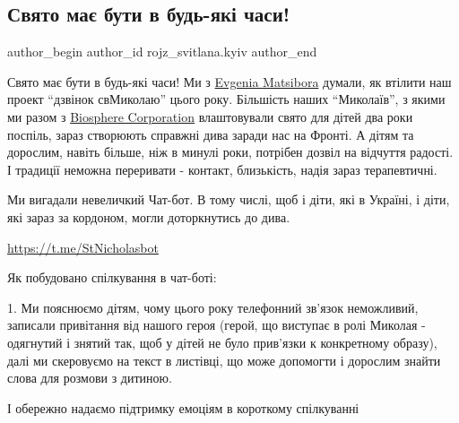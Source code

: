  
 
 
 
 
 
\subsection{Свято має бути в будь-які часи!}
\label{sec:14_12_2022.fb.rojz_svitlana.kyiv.1.svjato_chasy}
 
\ifcmt
 author_begin
   author_id rojz_svitlana.kyiv
 author_end
\fi

Свято має бути в будь-які часи! Ми з
\href{https://www.facebook.com/jenia.bogachyk}{Evgenia Matsibora}  думали, як
втілити наш проект \enquote{дзвінок свМиколаю} цього року. Більшість наших  \enquote{Миколаїв},
з якими ми разом з
\href{https://www.facebook.com/biosphere.corporation}{Biosphere Corporation}
влаштовували свято для дітей два роки поспіль, зараз  створюють справжні дива
заради нас на Фронті. А дітям та дорослим, навіть більше, ніж в минулі роки,
потрібен дозвіл на відчуття радості. І традиції неможна переривати - контакт,
близькість, надія зараз терапевтичні. 


Ми вигадали невеличкий Чат-бот. В тому числі, щоб і діти, які в Україні, і
діти, які зараз за кордоном, могли доторкнутись до дива.

\url{https://t.me/StNicholasbot}

Як побудовано спілкування в чат-боті:

1. Ми пояснюємо  дітям, чому цього року телефонний зв'язок неможливий, записали
привітання від нашого героя (герой, що виступає в ролі Миколая - одягнутий і
знятий так, щоб у дітей не було прив'язки к конкретному образу), далі ми
скеровуємо на текст в листівці, що може допомогти і дорослим знайти слова для
розмови з дитиною.

І обережно надаємо підтримку емоціям в короткому спілкуванні

